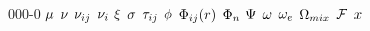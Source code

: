 \begin{mitframe}{000-0}
$\visc$ \newline
$\kinvisc$ \newline
$\stoich$ \newline
$\chargeval$ \newline
$\conjcoortwo$ \newline
$\symfac$ \newline
$\shear$ \newline
$\eleccoeff$ \newline
$\potfunc$ \newline
$\fftbasis$ \newline
$\dlesselecpot$ \newline
$\accentfac$ \newline
$\elecdegen$ \newline
$\combmixfunc$ \newline
$\faraday$ \newline
$\exscal$ \newline

\end{mitframe}
